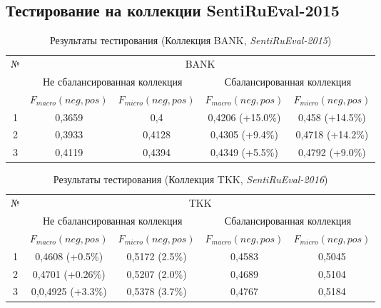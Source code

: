 \newpage
\subsection{Тестирование на коллекции SentiRuEval-2015}

\begin{table}[ht!]
\centering
\caption{Результаты тестирования (Коллекция BANK, {\it SentiRuEval-2015})}
\label{table:bankResult2015}
\begin{tabular}{|c|c|c|c|c|}
\hline
\multirow{3}{*}{№} & \multicolumn{4}{c|}{BANK}                                                               \\ \cline{2-5}
                   & \multicolumn{2}{c|}{Не сбалансированная коллекция} & \multicolumn{2}{c|}{Сбалансированная коллекция} \\ \cline{2-5}
                   & $F_{macro}(neg, pos)$    & $F_{micro}(neg, pos)$   & $F_{macro}(neg, pos)$  & $F_{micro}(neg, pos)$  \\ \hline
1                  & 0,3659                   & 0,4                     & 0,4206 (+15.0\%)       & 0,458 (+14.5\%)        \\ \hline
2                  & 0,3933                   & 0,4128                  & 0,4305 (+9.4\%)        & 0,4718 (+14.2\%)       \\ \hline
3                  & 0,4119                   & 0,4394                  & 0,4349 (+5.5\%)        & 0,4792 (+9.0\%)        \\ \hline
\end{tabular}
\end{table}

\begin{table}[ht!]
\centering
\caption{Результаты тестирования (Коллекция TKK, {\it SentiRuEval-2016})}
\label{table:tkkResult2015}
\begin{tabular}{|c|c|c|c|c|}
\hline
\multirow{3}{*}{№} & \multicolumn{4}{c|}{TKK}                                                                             \\ \cline{2-5}
                   & \multicolumn{2}{c|}{Не сбалансированная коллекция} & \multicolumn{2}{c|}{Сбалансированная коллекция} \\ \cline{2-5}
                   & $F_{macro}(neg, pos)$    & $F_{micro}(neg, pos)$   & $F_{macro}(neg, pos)$  & $F_{micro}(neg, pos)$  \\ \hline
1                  & 0,4608 (+0.5\%)          & 0,5172 (2.5\%)          & 0,4583                 & 0,5045                 \\ \hline
2                  & 0,4701 (+0.26\%)         & 0,5207 (2.0\%)          & 0,4689                 & 0,5104                 \\ \hline
3                  & 0,0,4925 (+3.3\%)        & 0,5378 (3.7\%)          & 0,4767                 & 0,5184                 \\ \hline
\end{tabular}
\end{table}

%
%
